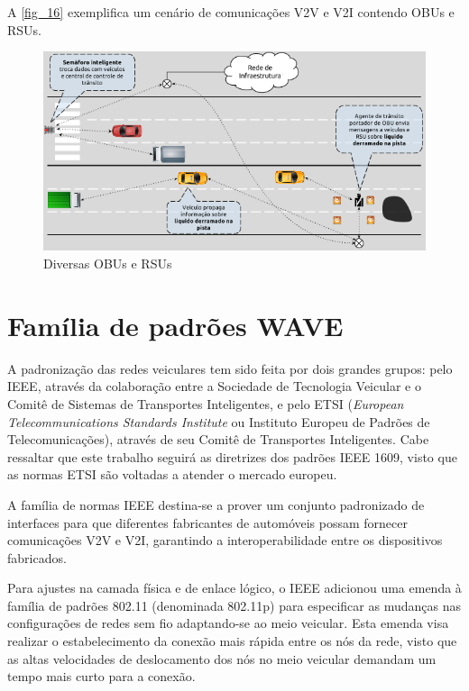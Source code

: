 \documentclass[
12pt,				%
openright,			%
oneside,			%
a4paper,			%
brazil,				%
]{abntex2}
\begin{document}
	\par A \autoref{fig_16} exemplifica um cenário de comunicações V2V e V2I contendo OBUs e RSUs.
	
	\begin{figure} [H]
		\centering
		\includegraphics[scale=.7]{figuras/cap3/16DiversasOBUsERSUs}
		\caption{\label{fig_16}Diversas OBUs e RSUs}
	\end{figure}
	
	\section{Família de padrões WAVE}
	
	\par A padronização das redes veiculares tem sido feita por dois grandes grupos: pelo IEEE, através da colaboração entre a Sociedade de Tecnologia Veicular e o Comitê de Sistemas de Transportes Inteligentes, e pelo ETSI (\textit{European Telecommunications Standards Institute} ou Instituto Europeu de Padrões de Telecomunicações), através de seu Comitê de Transportes Inteligentes. Cabe ressaltar que este trabalho seguirá as diretrizes dos padrões IEEE 1609, visto que as normas ETSI são voltadas a atender o mercado europeu.
	
	\par A família de normas IEEE destina-se a prover um conjunto padronizado de interfaces para que diferentes fabricantes de automóveis possam fornecer comunicações V2V e V2I, garantindo a interoperabilidade entre os dispositivos fabricados.
	
	\par Para ajustes na camada física e de enlace lógico, o IEEE adicionou uma emenda à família de padrões 802.11 (denominada 802.11p) para especificar as mudanças nas configurações de redes sem fio adaptando-se ao meio veicular. Esta emenda visa realizar o estabelecimento da conexão mais rápida entre os nós da rede, visto que as altas velocidades de deslocamento dos nós no meio veicular demandam um tempo mais curto para a conexão.
	
\end{document}
